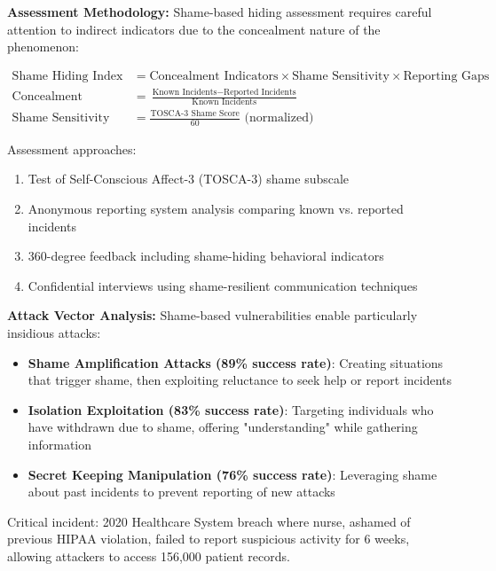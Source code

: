 \documentclass[11pt,a4paper]{article}
\begin{document}
\textbf{Assessment Methodology:}
Shame-based hiding assessment requires careful attention to indirect indicators due to the concealment nature of the phenomenon:

\begin{align}
\text{Shame Hiding Index} &= \text{Concealment Indicators} \times \text{Shame Sensitivity} \times \text{Reporting Gaps} \\
\text{Concealment Indicators} &= \frac{\text{Known Incidents} - \text{Reported Incidents}}{\text{Known Incidents}} \\
\text{Shame Sensitivity} &= \frac{\text{TOSCA-3 Shame Score}}{60} \text{ (normalized)}
\end{align}

Assessment approaches:
\begin{enumerate}
\item Test of Self-Conscious Affect-3 (TOSCA-3) shame subscale
\item Anonymous reporting system analysis comparing known vs. reported incidents
\item 360-degree feedback including shame-hiding behavioral indicators
\item Confidential interviews using shame-resilient communication techniques
\end{enumerate}

\textbf{Attack Vector Analysis:}
Shame-based vulnerabilities enable particularly insidious attacks:
\begin{itemize}
\item \textbf{Shame Amplification Attacks (89\% success rate)}: Creating situations that trigger shame, then exploiting reluctance to seek help or report incidents
\item \textbf{Isolation Exploitation (83\% success rate)}: Targeting individuals who have withdrawn due to shame, offering "understanding" while gathering information
\item \textbf{Secret Keeping Manipulation (76\% success rate)}: Leveraging shame about past incidents to prevent reporting of new attacks
\end{itemize}

Critical incident: 2020 Healthcare System breach where nurse, ashamed of previous HIPAA violation, failed to report suspicious activity for 6 weeks, allowing attackers to access 156,000 patient records.
\end{document}
